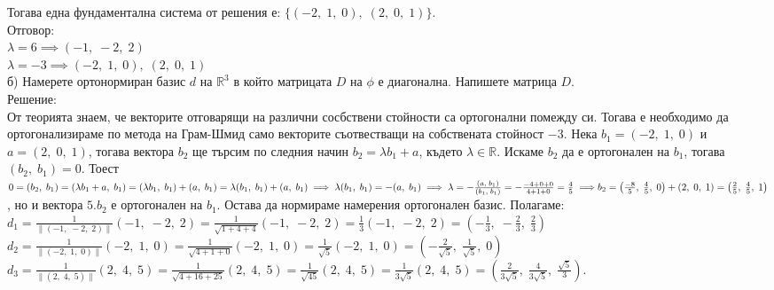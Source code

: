 \documentclass[12pt]{article}
\newcommand{\R}{\mathbb{R}}
\begin{document}
Тогава една фундаментална система от решения е: $\{(-2, \; 1, \; 0), \; (2, \; 0, \; 1)\}$. \\

Отговор: \\

$\lambda = 6 \implies (-1, \; -2, \; 2)$ \\

$\lambda = -3 \implies (-2, \; 1, \; 0), \; (2, \; 0, \; 1)$ \\

б) Намерете ортонормиран базис $d$ на $\R^3$ в който матрицата $D$ на $\phi$ е диагонална. Напишете матрица $D$. \\

Решение: \\

От теорията знаем, че векторите отговарящи на различни сосбствени стойности са ортогонални помежду си.
Тогава е необходимо да ортогонализираме по метода на Грам-Шмид само векторите съотвестващи на собствената стойност $-3$.
Нека $b_1 = (-2, \; 1, \; 0)$ и $a = (2, \; 0, \; 1)$, тогава вектора $b_2$ ще търсим по следния начин
$b_2 = \lambda b_1 + a$, където $\lambda \in \R$. Искаме $b_2$ да е ортогонален на $b_1$, тогава $(b_2, \; b_1) = 0$.
Тоест $0 = (b_2, \; b_1) = (\lambda b_1 + a, \; b_1) = (\lambda b_1, \; b_1) + (a, \; b_1) = \lambda(b_1, \; b_1) + (a, \; b_1)
\implies \lambda(b_1, \; b_1) = -(a, \; b_1) \implies \lambda = -\frac{(a, \; b_1)}{(b_1, \; b_1)} = -\frac{-4 + 0 + 0}{4 + 1 + 0} = \frac{4}{5} \implies \\\\
b_2 = \left(\frac{-8}{5}, \; \frac{4}{5}, \; 0\right) + (2, \; 0, \; 1) = \left(\frac{2}{5}, \; \frac{4}{5}, \; 1\right)$, но и вектора $5.b_2$ е ортогонален на $b_1$.
Остава да нормираме намерения ортогонален базис. Полагаме: \\

$d_1 = \frac{1}{\|(-1, \; -2, \; 2)\|}(-1, \; -2, \; 2) = \frac{1}{\sqrt{1 + 4 + 4}}(-1, \; -2, \; 2) = \frac{1}{3}(-1, \; -2, \; 2) = \left(-\frac{1}{3}, \; -\frac{2}{3}, \; \frac{2}{3}\right)$ \\

$d_2 = \frac{1}{\|(-2, \; 1, \; 0)\|}(-2, \; 1, \; 0) = \frac{1}{\sqrt{4 + 1 + 0}}(-2, \; 1, \; 0) = \frac{1}{\sqrt{5}}(-2, \; 1, \; 0) = \left(-\frac{2}{\sqrt{5}}, \; \frac{1}{\sqrt{5}}, \; 0\right)$ \\

$d_3 = \frac{1}{\|(2, \; 4, \; 5)\|}(2, \; 4, \; 5) = \frac{1}{\sqrt{4 + 16 + 25}}(2, \; 4, \; 5) = \frac{1}{\sqrt{45}}(2, \; 4, \; 5) = \frac{1}{3\sqrt{5}}(2, \; 4, \; 5) = \left(\frac{2}{3\sqrt{5}}, \; \frac{4}{3\sqrt{5}}, \; \frac{\sqrt{5}}{3}\right)$. \\
\end{document}
